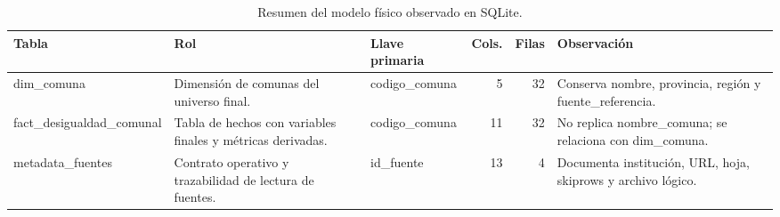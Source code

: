 \begin{table}[htbp]
\centering
\footnotesize
\caption{Resumen del modelo físico observado en SQLite.}
\begin{tabular}{|p{3.5cm}|p{4.2cm}|p{2.2cm}|r|r|p{3.2cm}|}
\hline
Tabla & Rol & Llave primaria & Cols. & Filas & Observación \\
\hline
dim\_comuna & Dimensión de comunas del universo final. & codigo\_comuna & 5 & 32 & Conserva nombre, provincia, región y fuente\_referencia. \\
fact\_desigualdad\_comunal & Tabla de hechos con variables finales y métricas derivadas. & codigo\_comuna & 11 & 32 & No replica nombre\_comuna; se relaciona con dim\_comuna. \\
metadata\_fuentes & Contrato operativo y trazabilidad de lectura de fuentes. & id\_fuente & 13 & 4 & Documenta institución, URL, hoja, skiprows y archivo lógico. \\
\hline
\end{tabular}
\end{table}
